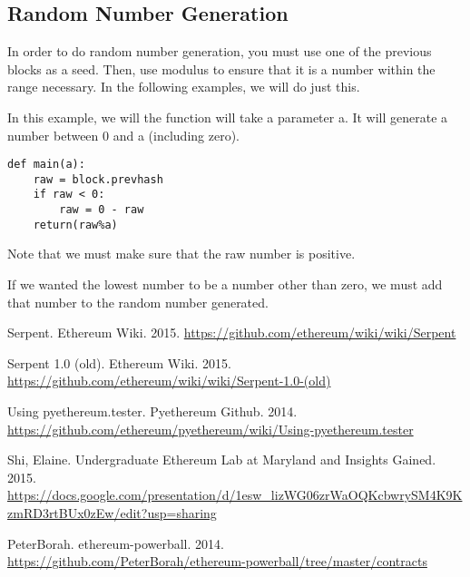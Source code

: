 \documentclass[12pt]{article}
\begin{document}
\subsection{Random Number Generation}
In order to do random number generation, you must use one of the previous blocks as a seed. Then, use modulus to ensure that it is a number within the range necessary. In the following examples, we will do just this.

In this example, we will the function will take a parameter a. It will generate a number between 0 and a (including zero).

\begin{lstlisting}
def main(a):
	raw = block.prevhash
	if raw < 0:
		raw = 0 - raw
	return(raw%a)
\end{lstlisting}

Note that we must make sure that the raw number is positive. \cite{PeterBorah 2014}

If we wanted the lowest number to be a number other than zero, we must add that number to the random number generated. 



\begin{thebibliography}{9}

	Serpent. Ethereum Wiki. 2015. \url{https://github.com/ethereum/wiki/wiki/Serpent}

	Serpent 1.0 (old). Ethereum Wiki. 2015. \url{https://github.com/ethereum/wiki/wiki/Serpent-1.0-(old)}

	Using pyethereum.tester. Pyethereum Github. 2014. \url{https://github.com/ethereum/pyethereum/wiki/Using-pyethereum.tester}

	Shi, Elaine. Undergraduate Ethereum Lab at Maryland and Insights Gained. 2015. \url{https://docs.google.com/presentation/d/1esw_lizWG06zrWaOQKcbwrySM4K9KzmRD3rtBUx0zEw/edit?usp=sharing}

	PeterBorah. ethereum-powerball. 2014. \url{https://github.com/PeterBorah/ethereum-powerball/tree/master/contracts}
	
\end{thebibliography}
\end{document}
